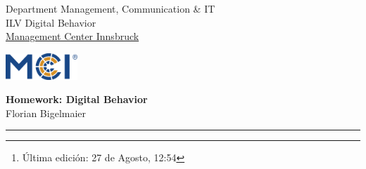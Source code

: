 \documentclass[11pt,letterpaper]{article}
\begin{document}

\usetikzlibrary{positioning}
\pagestyle{plain}


\noindent\begin{minipage}{0.5\textwidth}%
Department Management, Communication \& IT  \\
ILV Digital Behavior\\
\underline{Management Center Innsbruck} 

\end{minipage}%
\hfill%
\begin{minipage}{0.3\textwidth}\raggedleft
\includegraphics[height=1.0cm]{mci-logo.png}

\end{minipage}

 
\begin{center}\vspace{-1cm}
\textbf{\large Homework: Digital Behavior}\\   %
Florian Bigelmaier\\                         %
\end{center}
\rule{\linewidth}{0.1mm}



\begin{abstract}
    \noindent
    Esta template de \LaTeX viene preparada con muchos paquetes útiles, ya sea para escribir resoluciones matemáticas, importar imágenes, figuras, códigos, crear hipervínculos, signos matemáticos y mucho más. La he preparado durante mis últimos 2 años en la universidad, para poder entregar trabajos ordenados y completos. Ha sido probar muchos paquetes, ver errores, solucionarlos, editar y personalizar estilos hasta al fin encontrar algo que me guste y poder compartir con los demás para que puedan ocuparlo directamente o tener una base bien estructurada para poder crear sus propias templates, espero sea de utilidad para cualquiera que llegue hasta acá\footnote{Última edición: 27 de Agosto, 12:54}.
\end{abstract}
\end{document}
